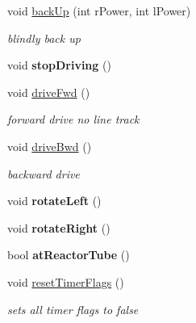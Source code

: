 \begin{DoxyCompactItemize}
\item 
\hypertarget{classRobot_a450cf38f963596663003f3d94b2bcf3b}{void \hyperlink{classRobot_a450cf38f963596663003f3d94b2bcf3b}{back\-Up} (int r\-Power, int l\-Power)}\label{classRobot_a450cf38f963596663003f3d94b2bcf3b}

\begin{DoxyCompactList}\small\item\em blindly back up \end{DoxyCompactList}\item 
\hypertarget{classRobot_a959f64b4829ade78bb332f205b50ee70}{void {\bfseries stop\-Driving} ()}\label{classRobot_a959f64b4829ade78bb332f205b50ee70}

\item 
\hypertarget{classRobot_a35897f5e7b5c8b29cc6d386c6089abea}{void \hyperlink{classRobot_a35897f5e7b5c8b29cc6d386c6089abea}{drive\-Fwd} ()}\label{classRobot_a35897f5e7b5c8b29cc6d386c6089abea}

\begin{DoxyCompactList}\small\item\em forward drive no line track \end{DoxyCompactList}\item 
\hypertarget{classRobot_ac8d0a3e0308350bc1fc3a2a78be2aaca}{void \hyperlink{classRobot_ac8d0a3e0308350bc1fc3a2a78be2aaca}{drive\-Bwd} ()}\label{classRobot_ac8d0a3e0308350bc1fc3a2a78be2aaca}

\begin{DoxyCompactList}\small\item\em backward drive \end{DoxyCompactList}\item 
\hypertarget{classRobot_a82a61a1f5fb4a17fd2277329bc6e8fe4}{void {\bfseries rotate\-Left} ()}\label{classRobot_a82a61a1f5fb4a17fd2277329bc6e8fe4}

\item 
\hypertarget{classRobot_a33e931c5ce2e2ce940c96203f1b6d057}{void {\bfseries rotate\-Right} ()}\label{classRobot_a33e931c5ce2e2ce940c96203f1b6d057}

\item 
\hypertarget{classRobot_a9183b1dd60c7d39bf6c8ecea5690b22c}{bool {\bfseries at\-Reactor\-Tube} ()}\label{classRobot_a9183b1dd60c7d39bf6c8ecea5690b22c}

\item 
\hypertarget{classRobot_ab7c87529c987ede12b934bdfc768507e}{void \hyperlink{classRobot_ab7c87529c987ede12b934bdfc768507e}{reset\-Timer\-Flags} ()}\label{classRobot_ab7c87529c987ede12b934bdfc768507e}

\begin{DoxyCompactList}\small\item\em sets all timer flags to false \end{DoxyCompactList}\end{DoxyCompactItemize}
